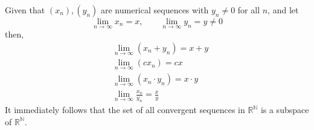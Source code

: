   \begin{theorem}
    \label{thm:arithmetic-on-limits}
    Given that $(x_n), (y_n)$ are numerical sequences with $y_n \neq 0$ for all $n$, and let 
    \begin{equation}
      \lim_{n \rightarrow \infty} x_n = x, \qquad \lim_{n \rightarrow \infty} y_n = y \neq 0
    \end{equation}
    then, 
    \begin{align}
      & \lim_{n\rightarrow \infty} (x_n + y_n) = x + y \\
      & \lim_{n \rightarrow \infty} (c x_n) = c x \\
      & \lim_{n \rightarrow \infty} (x_n \cdot y_n) = x \cdot y \\
      & \lim_{n \rightarrow \infty} \frac{x_n}{y_n} = \frac{x}{y}
    \end{align}
    It immediately follows that the set of all convergent sequences in $\mathbb{R}^\mathbb{N}$ is a subspace of $\mathbb{R}^\mathbb{N}$. 
  \end{theorem}
